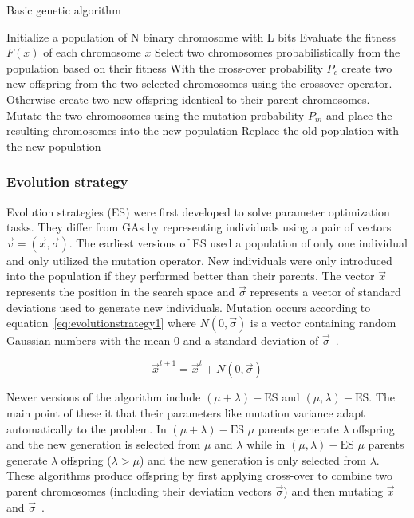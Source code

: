 \begin{algorithm}[h]

  \caption{Basic genetic algorithm}
  \label{algo:geneticalgorithm}
    \begin{algorithmic}
       \State Initialize a population of N binary chromosome with L bits
        \State Evaluate the fitness $F(x)$ of each chromosome $x$
        \Repeat
          \State Select two chromosomes probabilistically from the population
          \State based on their fitness
          \State With the cross-over probability $P_c$ create two new offspring
          \State from the two selected chromosomes using the crossover operator.
          \State Otherwise create two new offspring identical to their parent chromosomes.
          \State Mutate the two chromosomes using the mutation probability $P_m$
          \State and place the resulting chromosomes into the new population
        \State Replace the old population with the new population
       \EndWhile
    \end{algorithmic}
\end{algorithm}

\subsubsection{Evolution strategy}

Evolution strategies (ES) were first developed to solve parameter optimization tasks. They differ from GAs by representing individuals using a pair of vectors $\vec{v} = (\vec{x},\vec{\sigma})$. The earliest versions of ES used a population of only one individual and only utilized the mutation operator. New individuals were only introduced into the population if they performed better than their parents. The vector $\vec{x}$ represents the position in the search space and $\vec{\sigma}$ represents a vector of standard deviations used to generate new individuals. Mutation occurs according to equation~\ref{eq:evolutionstrategy1} where $N(0,\vec{\sigma})$ is a vector containing random Gaussian numbers with the mean $0$ and a standard deviation of $\vec{\sigma}$~\cite{Michalewicz1997}.

\begin{equation}
  \vec{x}^{t+1} =  \vec{x}^{t} + N(0,\vec{\sigma})
  \label{eq:evolutionstrategy1}
\end{equation}

Newer versions of the algorithm include $(\mu + \lambda)-\text{ES}$ and $(\mu,\lambda)-\text{ES}$. The main point of these it that their parameters like mutation variance adapt automatically to the problem. In $(\mu + \lambda)-\text{ES}$ $\mu$ parents generate $\lambda$ offspring and the new generation is selected from $\mu$ and $\lambda$ while in $(\mu,\lambda)-\text{ES}$ $\mu$ parents generate $\lambda$ offspring ($\lambda > \mu$) and the new generation is only selected from $\lambda$. These algorithms produce offspring by first applying cross-over to combine two parent chromosomes (including their deviation vectors $\vec{\sigma}$) and then mutating $\vec{x}$ and $\vec{\sigma}$~\cite{Michalewicz1997}.

